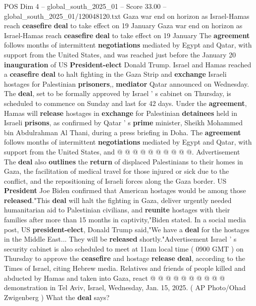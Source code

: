 \begin{textsample}{POS Dim 4 – global\_south\_2025\_01 – Score 33.00 – global\_south\_2025\_01/120048120.txt}  \label{ex:f4_pos_001}
Gaza war end on horizon as Israel-Hamas reach \textbf{ceasefire} \textbf{deal} to take effect on 19 January Gaza war end on horizon as Israel-Hamas reach \textbf{ceasefire} \textbf{deal} to take effect on 19 January The \textbf{agreement} follows months of intermittent \textbf{negotiations} mediated by Egypt and Qatar, with support from the United States, and was reached just before the January 20 \textbf{inauguration} of US \textbf{President-elect} Donald Trump.
Israel and Hamas reached a \textbf{ceasefire} \textbf{deal} to halt fighting in the Gaza Strip and \textbf{exchange} Israeli hostages for Palestinian \textbf{prisoners},, \textbf{mediator} Qatar announced on Wednesday.
The \textbf{deal}, set to be formally approved by Israel ' s cabinet on Thursday, is scheduled to commence on Sunday and last for 42 days.
Under the \textbf{agreement}, Hamas will \textbf{release} hostages in \textbf{exchange} for Palestinian \textbf{detainees} held in Israeli \textbf{prisons}, as confirmed by Qatar ' s \textbf{prime} minister, Sheikh Mohammed bin Abdulrahman Al Thani, during a press briefing in Doha.
The \textbf{agreement} follows months of intermittent \textbf{negotiations} mediated by Egypt and Qatar, with support from the United States, and @ @ @ @ @ @ @ @ @ @.
Advertisement The \textbf{deal} also \textbf{outlines} the \textbf{return} of displaced Palestinians to their homes in Gaza, the facilitation of medical travel for those injured or sick due to the conflict, and the repositioning of Israeli forces along the Gaza border.
US \textbf{President} Joe Biden confirmed that American hostages would be among those \textbf{released}."This \textbf{deal} will halt the fighting in Gaza, deliver urgently needed humanitarian aid to Palestinian civilians, and \textbf{reunite} hostages with their families after more than 15 months in captivity,"Biden stated.
In a social media post, US \textbf{president-elect}, Donald Trump said,"We have a \textbf{deal} for the hostages in the Middle East...
They will be \textbf{released} shortly."Advertisement Israel ' s security cabinet is also scheduled to meet at 11am local time ( 0900 GMT ) on Thursday to approve the \textbf{ceasefire} and hostage \textbf{release} \textbf{deal}, according to the Times of Israel, citing Hebrew media.
Relatives and friends of people killed and abducted by Hamas and taken into Gaza, react @ @ @ @ @ @ @ @ @ @ demonstration in Tel Aviv, Israel, Wednesday, Jan. 15, 2025. ( AP Photo/Ohad Zwigenberg ) What the \textbf{deal} says?

\end{textsample}
